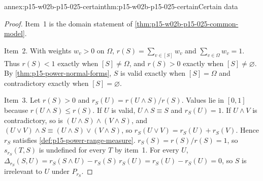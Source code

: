 \begin{annexitem}{annex:p15-w02b-p15-025-certain}{thm:p15-w02b-p15-025-certain}{Certain data}
\begin{proof}
Item~1 is the domain statement of
\cref{thm:p15-w02b-p15-025-common-model}.

Item~2. With weights \(w_v>0\) on \(\Omega\), \(r(S)=\sum_{v\in[S]}w_v\)
and \(\sum_{v\in\Omega}w_v=1\). Thus \(r(S)<1\) exactly when
\([S]\neq\Omega\), and \(r(S)>0\) exactly when \([S]\neq\varnothing\).
By \cref{thm:p15-power-normal-forms}, \(S\) is valid exactly when
\([S]=\Omega\) and contradictory exactly when \([S]=\varnothing\).

Item~3. Let \(r(S)>0\) and \(r_S(U)=r(U\wedge S)/r(S)\). Values lie in
\([0,1]\) because \(r(U\wedge S)\le r(S)\). If \(U\) is valid,
\(U\wedge S\equiv S\) and \(r_S(U)=1\). If \(U\wedge V\) is
contradictory, so is \((U\wedge S)\wedge(V\wedge S)\), and
\((U\vee V)\wedge S\equiv(U\wedge S)\vee(V\wedge S)\), so
\(r_S(U\vee V)=r_S(U)+r_S(V)\). Hence \(r_S\) satisfies
\cref{def:p15-power-range-measure}. \(r_S(S)=r(S)/r(S)=1\), so
\(s_{r_S}(T,S)\) is undefined for every \(T\) by item~1. For every
\(U\), \(\Delta_{r_S}(S,U)=r_S(S\wedge U)-r_S(S)\,r_S(U)
=r_S(U)-r_S(U)=0\), so \(S\) is irrelevant to \(U\) under \(P_{r_S}\).
\end{proof}
\end{annexitem}

